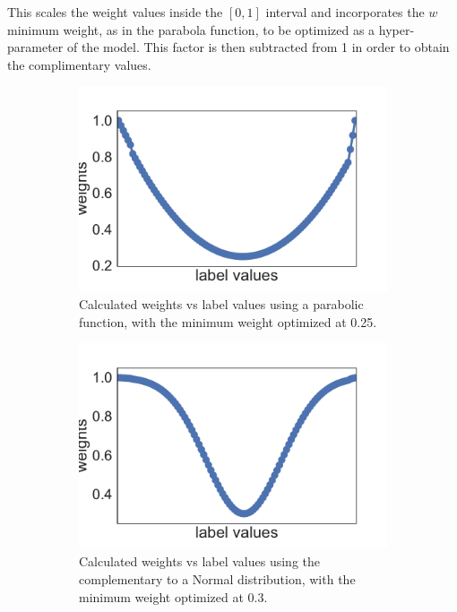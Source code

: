 \documentclass[12pt,a4paper]{report}
\begin{document}
This scales the weight values inside the $[0,1]$ interval and incorporates the $w$ minimum weight, as in the parabola function, to be optimized as a hyper-parameter of the model. This factor is then subtracted from 1 in order to obtain the complimentary values.

\begin{figure}
    \centering
        \begin{subfigure}[b]{0.45\textwidth}
        \includegraphics[width=\textwidth]{imgs/180630_ParabolicWeighting_example.pdf}
        \caption{Calculated weights vs label values using a parabolic function, with the minimum weight optimized at 0.25.}
        \label{fig:complementary_Normal_weights}
    \end{subfigure}
    \begin{subfigure}[b]{0.45\textwidth}
        \includegraphics[width=\textwidth]{imgs/180628_1NormalWeighting_example.pdf}
        \caption{Calculated weights vs label values using the complementary to a Normal distribution, with the minimum weight optimized at 0.3.}
        \label{fig:parabolic_weights}
    \end{subfigure}
    \caption{}
    \label{fig:all_weights}
\end{figure}
\end{document}
